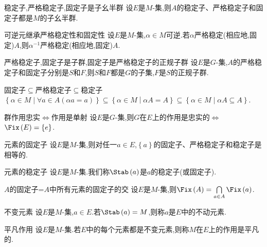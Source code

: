 \begin{proposition}{稳定子,严格稳定子,固定子是子幺半群}{}
	设$E$是$M$-集,则$A$的稳定子、严格稳定子和固定子都是$M$的子幺半群.
\end{proposition}

\begin{proposition}{可逆元继承严格稳定性和固定性}{}
	设$E$是$M$-集,$\alpha\in M$可逆.若$\alpha$严格稳定(相应地,固定)$A$,则$\alpha^{-1}$严格稳定(相应地,固定)$A$.
\end{proposition}

\begin{corollary}{严格稳定子,固定子是子群,固定子是严格稳定子的正规子群}{}
	设$E$是$G$-集,$A$的严格稳定子和固定子分别是$S$和$F$,则$S$和$F$都是$G$的子集,$F$是$S$的正规子群.
\end{corollary}

\begin{proposition}{固定子$\subseteq$严格稳定子$\subseteq$稳定子}{}
	$\left\{\alpha\in M\middle|\forall a\in A\left(\alpha a=a\right)\right\}\subseteq\left\{\alpha\in M\middle|\alpha A=A\right\}\subseteq\left\{\alpha\in M\middle|\alpha A\subseteq A\right\}$.
\end{proposition}

\begin{proposition}{群作用忠实$\iff$作用是单射}{}
	设$E$是$G$-集,则$G$在$E$上的作用是忠实的$\iff$ $\Fix\left(E\right)=\left\{e\right\}$.
\end{proposition}

\begin{proposition}{元素的固定子}{}
	设$E$是$M$-集,则对任一$a\in E$,$\left\{a\right\}$的固定子、严格稳定子和稳定子是相等的.
\end{proposition}

\begin{definition}{元素的稳定子}{}
	设$E$是$M$-集.我们称$\Stab\left(a\right)$是$a$的稳定子(或固定子).
\end{definition}

\begin{proposition}{$A$的固定子=$A$中所有元素的固定子的交}{}
	设$E$是$M$-集,则$\Fix\left(A\right)=\bigcap\limits_{a\in A}\Fix\left(a\right)$.
\end{proposition}

\begin{definition}{不变元素}{}
	设$E$是$M$-集,$a\in E$.若$\Stab\left(a\right)=M$,则称$a$是$E$中的不动元素.
\end{definition}

\begin{definition}{平凡作用}{}
	设$E$是$M$-集.若$E$中的每个元素都是不变元素,则称$M$在$E$上的作用是平凡的.
\end{definition}

